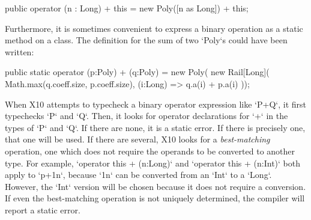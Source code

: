 \begin{ex}
% 
\begin{xten}
   public operator (n : Long) + this 
          = new Poly([n as Long]) + this;
\end{xten}
% 
%     

Furthermore, it is sometimes convenient to express a binary operation as a
static method on a class. 
The definition for the sum of two
\xcd`Poly`s could have been written:
\begin{xten}
  public static operator (p:Poly) + (q:Poly) =  new Poly(
     new Rail[Long](
        Math.max(q.coeff.size, p.coeff.size),
        (i:Long) => q.a(i) + p.a(i)
     ));
\end{xten}
%
% 
%     

\end{ex}

When X10 attempts to typecheck a binary operator expression like \xcd`P+Q`, it
first typechecks \xcd`P` and \xcd`Q`. Then, it looks for operator declarations
for \xcd`+` in the types of \xcd`P` and \xcd`Q`. If there are none, it is a
static error. If there is precisely one, that one will be used. If there are
several, X10 looks for a {\em best-matching} operation, \viz{} one which does
not require the operands to be converted to another type. For example,
\xcd`operator this + (n:Long)` and \xcd`operator this + (n:Int)` both apply to
\xcd`p+1n`, because \xcd`1n` can be converted from an \xcd`Int` to a \xcd`Long`.
However, the \xcd`Int` version will be chosen because it does not require a
conversion. If even the best-matching operation is not uniquely determined,
the compiler will report a static error.


